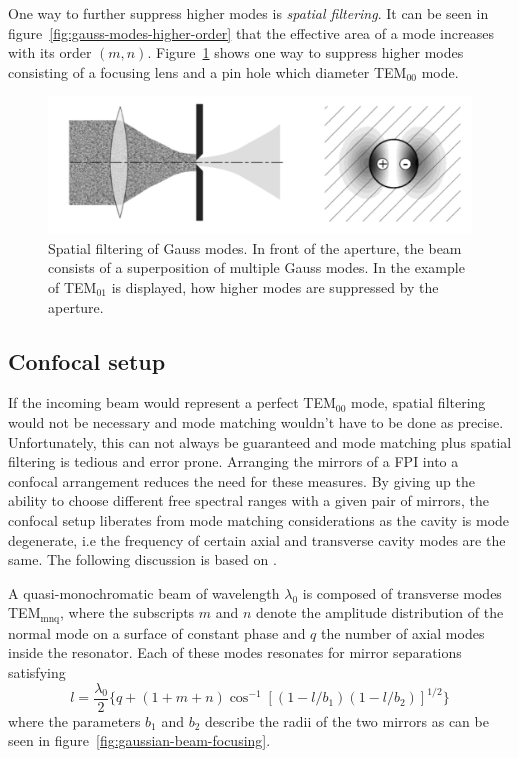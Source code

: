 One way to further suppress higher modes is \textit{spatial filtering}. It can be seen in figure~\ref{fig:gauss-modes-higher-order} that the effective area of a mode increases with its order $(m, n)$. Figure~\ref{fig:spatial-filtering-of-gauss-modes} shows one way to suppress higher modes consisting of a focusing lens and a pin hole which diameter TEM$_{00}$ mode.

\begin{figure}[H]
	\centering
	\includegraphics[width=0.8\linewidth]{figures/fabry-perot/spatial-filtering-of-gauss-modes}
	\caption[Spatial filtering of Gauss modes.]{Spatial filtering of Gauss modes.
		In front of the aperture, the beam consists of a superposition of multiple Gauss modes.
		In the example of TEM$_{01}$ is displayed, how higher modes are suppressed by the aperture.~\cite{meschede_optik_2008}}
		\label{fig:spatial-filtering-of-gauss-modes}
	\end{figure}



\subsection{Confocal setup}
\label{subsec:confocal-setup}

If the incoming beam would represent a perfect TEM$_{00}$ mode, spatial filtering would not be necessary and mode matching wouldn't have to be done as precise. Unfortunately, this can not always be guaranteed and mode matching plus spatial filtering is tedious and error prone. Arranging the mirrors of a \ac{FPI} into a confocal arrangement reduces the need for these measures.
By giving up the ability to choose different free spectral ranges with a given pair of mirrors, the confocal setup liberates from mode matching considerations as the cavity is mode degenerate, i.e the frequency of certain axial and transverse cavity modes are the same.
The following discussion is based on \textcite{hercher_spherical_1968}.

A quasi-monochromatic beam of wavelength $\lambda_0$ is composed of transverse modes TEM$_{\textrm{mnq}}$, where the subscripts $m$ and $n$ denote the amplitude distribution of the normal mode on a surface of constant phase and $q$ the number of axial modes inside the resonator.
Each of these modes resonates for mirror separations satisfying
\begin{equation}
l = \frac{\lambda_0}{2}\{q + \left(1 + m + n\right) \cos^{-1}\left[(1-l/b_1)(1-l/b_2)\right]^{1/2}\}
\end{equation}
where the parameters $b_1$ and $b_2$ describe the radii of the two mirrors as can be seen in figure~\ref{fig:gaussian-beam-focusing}.

